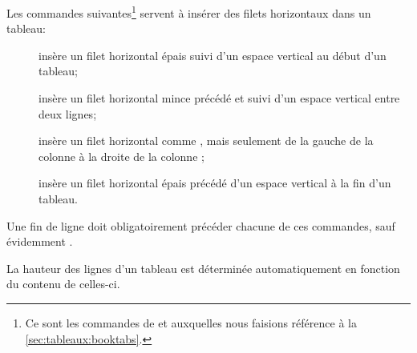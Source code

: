 \begin{list}{}
  Les commandes suivantes\footnote{%
    Ce sont les commandes de  et 
auxquelles nous faisions référence à la \autoref{sec:tableaux:booktabs}.} %
  servent à insérer des filets horizontaux dans un tableau:
  \begin{description}
  \item[\normalfont\cmd{\toprule}] insère un filet horizontal épais
    suivi d'un espace vertical au début d'un tableau;
  \item[\normalfont\cmd{\midrule}] insère un filet horizontal mince
    précédé et suivi d'un espace vertical entre deux lignes;
  \item[\normalfont\cmd{\cmidrule}] insère un filet
    horizontal comme \cmd{\midrule}, mais seulement de la gauche de la
    colonne  à la droite de la colonne ;
  \item[\normalfont\cmd{\bottomrule}] insère un filet horizontal épais
    précédé d'un espace vertical à la fin d'un tableau.
  \end{description}
  Une fin de ligne {\bs\bs}  doit  obligatoirement précéder chacune
  de ces commandes, sauf évidemment \cmd{\toprule}.
\end{list}

La hauteur des lignes d'un tableau est déterminée automatiquement en
fonction du contenu de celles-ci.

